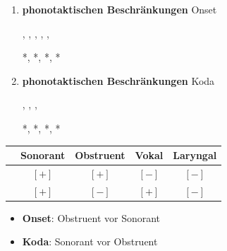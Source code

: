\begin{frame}

\begin{enumerate}
	\item \textbf{phonotaktischen Beschränkungen} \ras Onset
	
          \ea
          , \textipa{[pla:n]}, \textipa{[f\textscr E\c{c}]},
          \textipa{[flo:]}, \textipa{[kni:]}, \textipa{[gna:d@]}
          \z

          \ea
          *\textipa{[lbat]}, *\textipa{[\textscr to:k]}, *\textipa{[nki:l]}, *\textipa{[ngak]}
          \z

	\item \textbf{phonotaktischen Beschränkungen} \ras Koda

          \ea
          \textipa{[kalt]}, \textipa{[ha5t]}, \textipa{[lant]}, 
          \z

          \ea
          *\textipa{[katl]}, *, *\textipa{[latn]}, *
          \z

\end{enumerate}
	

\begin{table}
\centering
\begin{tabular}{c|c|c|c|c} 
 & Sonorant & Obstruent & Vokal & Laryngal \\ 
\hline 
[kon] & $[+]$ & $[+]$ & $[-]$ & $[-]$ \\ 
\hline 
[son] & $[+]$ & $[-]$ & $[+]$ & $[-]$
\end{tabular} 

\end{table}

\begin{itemize}
	\item \textbf{Onset}: Obstruent vor Sonorant
	\item \textbf{Koda}: Sonorant vor Obstruent
\end{itemize}

\end{frame}




